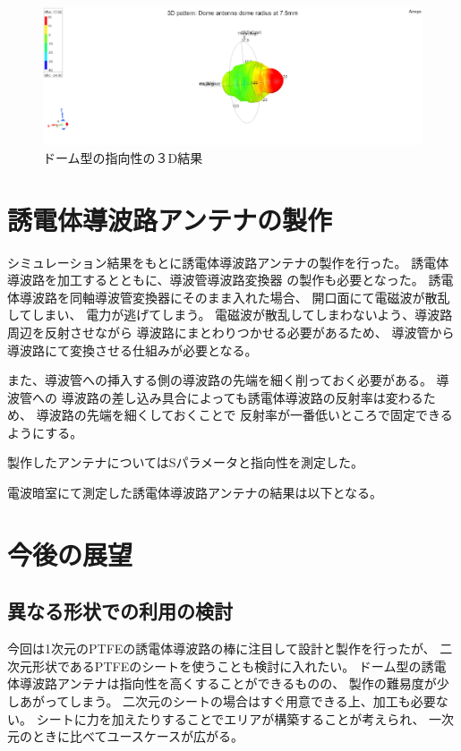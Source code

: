 \documentclass[technicalreport]{ieicej}
\begin{document}
\begin{figure}[tb]
  \begin{center}
    \includegraphics[bb=0 0 324 216, width=1.0\linewidth]{img/dome_directivity.pdf}
    \caption{ドーム型の指向性の３D結果}
    \label{fig:dome_3d_directivity_results}
  \end{center}
\end{figure}


\section{誘電体導波路アンテナの製作}

シミュレーション結果をもとに誘電体導波路アンテナの製作を行った。
誘電体導波路を加工するとともに、導波管導波路変換器
の製作も必要となった。
誘電体導波路を同軸導波管変換器にそのまま入れた場合、
開口面にて電磁波が散乱してしまい、
電力が逃げてしまう。
電磁波が散乱してしまわないよう、導波路周辺を反射させながら
導波路にまとわりつかせる必要があるため、
導波管から導波路にて変換させる仕組みが必要となる。

また、導波管への挿入する側の導波路の先端を細く削っておく必要がある。
導波管への
導波路の差し込み具合によっても誘電体導波路の反射率は変わるため、
導波路の先端を細くしておくことで
反射率が一番低いところで固定できるようにする。

製作したアンテナについてはSパラメータと指向性を測定した。

電波暗室にて測定した誘電体導波路アンテナの結果は以下となる。

\section{今後の展望}

\subsection{異なる形状での利用の検討}

今回は1次元のPTFEの誘電体導波路の棒に注目して設計と製作を行ったが、
二次元形状であるPTFEのシートを使うことも検討に入れたい。
ドーム型の誘電体導波路アンテナは指向性を高くすることができるものの、
製作の難易度が少しあがってしまう。
二次元のシートの場合はすぐ用意できる上、加工も必要ない。
シートに力を加えたりすることでエリアが構築することが考えられ、
一次元のときに比べてユースケースが広がる。
\end{document}
